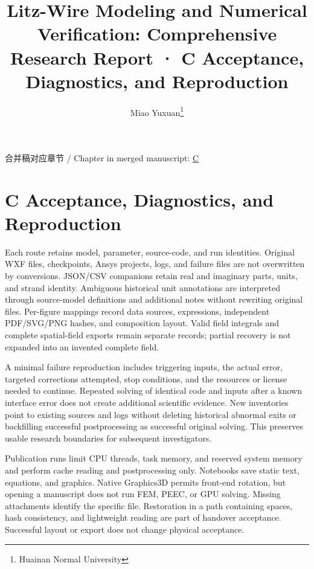 \documentclass[journal,10pt]{IEEEtran}
\begin{document}
\title{Litz-Wire Modeling and Numerical Verification: Comprehensive Research Report · C Acceptance, Diagnostics, and Reproduction}
\author{Miao Yuxuan\thanks{Huainan Normal University}}

\maketitle
\noindent 合并稿对应章节 / Chapter in merged manuscript: \href{report_en_ieee.pdf#chapter-C}{C}\par
\FloatBarrier
\section*{C Acceptance, Diagnostics, and Reproduction}
\hypertarget{chapter-C}{}
Each route retains model, parameter, source-code, and run identities. Original WXF files, checkpoints, Ansys projects, logs, and failure files are not overwritten by conversions. JSON/CSV companions retain real and imaginary parts, units, and strand identity. Ambiguous historical unit annotations are interpreted through source-model definitions and additional notes without rewriting original files. Per-figure mappings record data sources, expressions, independent PDF/SVG/PNG hashes, and composition layout. Valid field integrals and complete spatial-field exports remain separate records; partial recovery is not expanded into an invented complete field.


A minimal failure reproduction includes triggering inputs, the actual error, targeted corrections attempted, stop conditions, and the resources or license needed to continue. Repeated solving of identical code and inputs after a known interface error does not create additional scientific evidence. New inventories point to existing sources and logs without deleting historical abnormal exits or backfilling successful postprocessing as successful original solving. This preserves usable research boundaries for subsequent investigators.


Publication runs limit CPU threads, task memory, and reserved system memory and perform cache reading and postprocessing only. Notebooks save static text, equations, and graphics. Native Graphics3D permits front-end rotation, but opening a manuscript does not run FEM, PEEC, or GPU solving. Missing attachments identify the specific file. Restoration in a path containing spaces, hash consistency, and lightweight reading are part of handover acceptance. Successful layout or export does not change physical acceptance.
\end{document}
